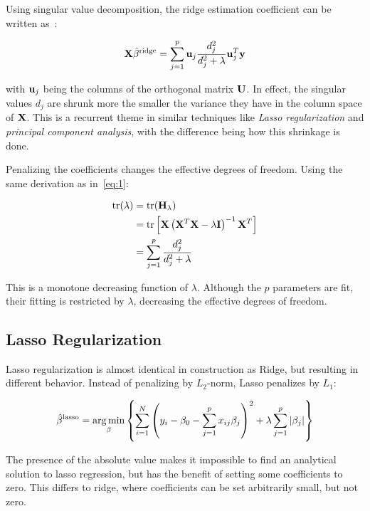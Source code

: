 Using singular value decomposition, the ridge estimation coefficient can be
written as~\cite{statelem}:

\begin{equation*}
  \vb{X}\hat\beta^{\text{ridge}} = \sum_{j=1}^{p} \vb{u}_{j}\frac{d_{j}^{2}}{d_{j}^{2}+ \lambda}\vb{u}_{j}^{T}\vb{y}
\end{equation*}

with \(\vb{u}_{j}\) being the columns of the orthogonal matrix \(\vb{U}\). In
effect, the singular values \(d_{j}\) are shrunk more the smaller the variance
they have in the column space of \(\vb{X}\). This is a recurrent theme in
similar techniques like \textit{Lasso regularization} and \textit{principal
  component analysis}, with the difference being how this shrinkage is done.

Penalizing the coefficients changes the effective degrees of freedom. Using the
same derivation as in~\eqref{eq:1}:

\begin{align*}
  \text{tr}(\lambda) &= \text{tr}(\vb{H}_{\lambda}) \\
  &= \text{tr}\left[ \vb{X}\left( \vb{X}^{T}\vb{X}  - \lambda \vb{I}\right)^{-1}\vb{X}^{T}\right]\\
                     &= \sum_{j=1}^{p}\frac{d_{j}^{2}}{d_{j}^{2}+\lambda}
\end{align*}

This is a monotone decreasing function of \(\lambda\). Although the \(p\)
parameters are fit, their fitting is restricted by \(\lambda\), decreasing the
effective degrees of freedom.

\subsection{Lasso Regularization}\label{subsec:Lasso}
Lasso regularization is almost identical in construction as Ridge, but resulting
in different behavior. Instead of penalizing by \(L_{2}\)-norm, Lasso penalizes by
\(L_{1}\):

\begin{equation*}
  \hat\beta^{\text{lasso}}  = \operatorname*{arg\,min}_{\beta}\left\{ \sum_{i=1}^{N}\left( y_{i} - \beta_{0} - \sum_{j=1}^{p}x_{ij}\beta_{j} \right)^{2} + \lambda\sum_{j=1}^{p}|\beta_{j}| \right\}
\end{equation*}

The presence of the absolute value makes it impossible to find an analytical
solution to lasso regression, but has the benefit of setting some coefficients
to zero. This differs to ridge, where coefficients can be set arbitrarily small,
but not zero. 

